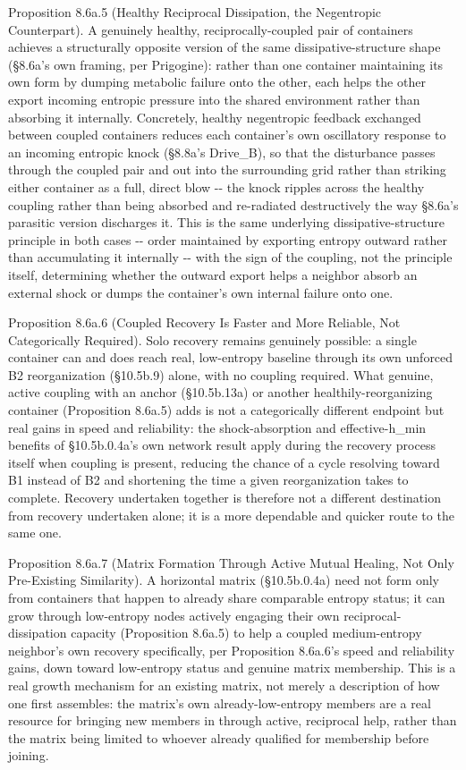 \documentclass[
]{article}
\begin{document}
Proposition 8.6a.5 (Healthy Reciprocal Dissipation, the Negentropic
Counterpart). A genuinely healthy, reciprocally-coupled pair of
containers achieves a structurally opposite version of the same
dissipative-structure shape (§8.6a's own framing, per Prigogine): rather
than one container maintaining its own form by dumping metabolic failure
onto the other, each helps the other export incoming entropic pressure
into the shared environment rather than absorbing it internally.
Concretely, healthy negentropic feedback exchanged between coupled
containers reduces each container's own oscillatory response to an
incoming entropic knock (§8.8a's Drive\_B), so that the disturbance
passes through the coupled pair and out into the surrounding grid rather
than striking either container as a full, direct blow -\/- the knock
ripples across the healthy coupling rather than being absorbed and
re-radiated destructively the way §8.6a's parasitic version discharges
it. This is the same underlying dissipative-structure principle in both
cases -\/- order maintained by exporting entropy outward rather than
accumulating it internally -\/- with the sign of the coupling, not the
principle itself, determining whether the outward export helps a
neighbor absorb an external shock or dumps the container's own internal
failure onto one.

Proposition 8.6a.6 (Coupled Recovery Is Faster and More Reliable, Not
Categorically Required). Solo recovery remains genuinely possible: a
single container can and does reach real, low-entropy baseline through
its own unforced B2 reorganization (§10.5b.9) alone, with no coupling
required. What genuine, active coupling with an anchor (§10.5b.13a) or
another healthily-reorganizing container (Proposition 8.6a.5) adds is
not a categorically different endpoint but real gains in speed and
reliability: the shock-absorption and effective-h\_min benefits of
§10.5b.0.4a's own network result apply during the recovery process
itself when coupling is present, reducing the chance of a cycle
resolving toward B1 instead of B2 and shortening the time a given
reorganization takes to complete. Recovery undertaken together is
therefore not a different destination from recovery undertaken alone; it
is a more dependable and quicker route to the same one.

Proposition 8.6a.7 (Matrix Formation Through Active Mutual Healing, Not
Only Pre-Existing Similarity). A horizontal matrix (§10.5b.0.4a) need
not form only from containers that happen to already share comparable
entropy status; it can grow through low-entropy nodes actively engaging
their own reciprocal-dissipation capacity (Proposition 8.6a.5) to help a
coupled medium-entropy neighbor's own recovery specifically, per
Proposition 8.6a.6's speed and reliability gains, down toward
low-entropy status and genuine matrix membership. This is a real growth
mechanism for an existing matrix, not merely a description of how one
first assembles: the matrix's own already-low-entropy members are a real
resource for bringing new members in through active, reciprocal help,
rather than the matrix being limited to whoever already qualified for
membership before joining.
\end{document}
